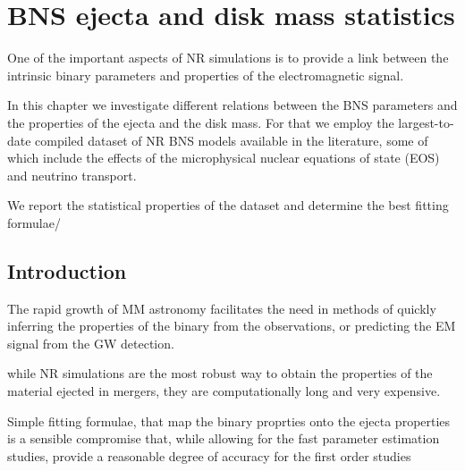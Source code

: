 
\chapter{\ac{BNS} ejecta and disk mass statistics} %

\label{ch:stat} %

\newcommand{\DSrefset}{\texttt{M0RefSet}} 
\newcommand{\DSheatcool}{\texttt{M0/M1Set}} 
\newcommand{\DScool}{\texttt{LeakSet}}
\newcommand{\DSnone}{\texttt{NoNusSet}}

\def\chid{\chi_{\nu}^2}
\def\non{\nonumber}


One of the important aspects of \ac{NR} simulations is to provide a link between the intrinsic binary parameters and properties of the electromagnetic signal.

In this chapter we investigate different relations between the \ac{BNS} parameters 
and the properties of the ejecta and the disk mass.
For that we employ the largest-to-date compiled dataset of \ac{NR} \ac{BNS} models 
available in the literature, some of which include the effects of the 
microphysical nuclear equations of state (EOS) and neutrino transport.

We report the statistical properties of the dataset and determine the 
best fitting formulae/ 


\section{Introduction}

The rapid growth of \ac{MM} astronomy facilitates the need in methods of quickly inferring the properties 
of the binary from the observations, or predicting the \ac{EM} signal from the \ac{GW} detection.

while \ac{NR} simulations are the most robust way to obtain the properties of the material
ejected in mergers, they are computationally long and very expensive. 

Simple fitting formulae, that map the binary proprties onto the ejecta properties is a sensible
compromise that, while allowing for the fast parameter estimation studies, provide a reasonable 
degree of accuracy for the first order studies 


